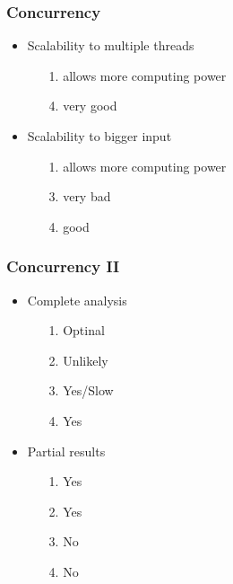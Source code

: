 \documentclass{beamer}
\begin{document}
	\begin{frame}
		\frametitle{Concurrency}
		
		\begin{itemize}
			\item Scalability to multiple threads
			\begin{itemize}
				\color{Paper1Full}  \item[1.] allows more computing power
				\color{Paper4Full}  \item[4.] very good
			\end{itemize}
			\item Scalability to bigger input
			\begin{itemize}
				\color{Paper1Full}  \item[1.] allows more computing power
				\color{Paper3Full}  \item[3.] very bad
				\color{Paper4Full}  \item[4.] good
			\end{itemize}
		\end{itemize}
	\end{frame}
	
	\begin{frame}
		\frametitle{Concurrency II}
		
		\begin{itemize}
			\item Complete analysis
			\begin{itemize}
				\color{Paper1Full}  \item[1.] Optinal
				\color{Paper2Full}  \item[2.] Unlikely
				\color{Paper3Full}  \item[3.] Yes/Slow
				\color{Paper4Full}  \item[4.] Yes
			\end{itemize}
			\item Partial results
			\begin{itemize}
				\color{Paper1Full}  \item[1.] Yes
				\color{Paper2Full}  \item[2.] Yes
				\color{Paper3Full}  \item[3.] No
				\color{Paper4Full}  \item[4.] No
			\end{itemize}
		\end{itemize}
	\end{frame}
	
\end{document}
